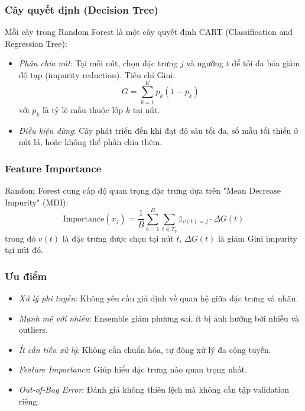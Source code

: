 ﻿\documentclass{article}
\begin{document}
\subsubsection*{Cây quyết định (Decision Tree)}
Mỗi cây trong Random Forest là một cây quyết định CART (Classification and Regression Tree):
\begin{itemize}
    \item \textit{Phân chia nút}: Tại mỗi nút, chọn đặc trưng $j$ và ngưỡng $t$ để tối đa hóa giảm độ tạp (impurity reduction). Tiêu chí Gini:
    \begin{equation}
    G = \sum_{k=1}^{K}p_k(1-p_k)
    \end{equation}
    với $p_k$ là tỷ lệ mẫu thuộc lớp $k$ tại nút.
    \item \textit{Điều kiện dừng}: Cây phát triển đến khi đạt độ sâu tối đa, số mẫu tối thiểu ở nút lá, hoặc không thể phân chia thêm.
\end{itemize}

\subsubsection*{Feature Importance}
Random Forest cung cấp độ quan trọng đặc trưng dựa trên "Mean Decrease Impurity" (MDI):
\begin{equation}
\text{Importance}(x_j) = \frac{1}{B}\sum_{b=1}^{B}\sum_{t \in T_b}\mathbb{1}_{v(t)=j} \cdot \Delta G(t)
\end{equation}
trong đó $v(t)$ là đặc trưng được chọn tại nút $t$, $\Delta G(t)$ là giảm Gini impurity tại nút đó.

\subsubsection*{Ưu điểm}
\begin{itemize}
    \item \textit{Xử lý phi tuyến}: Không yêu cầu giả định về quan hệ giữa đặc trưng và nhãn.
    \item \textit{Mạnh mẽ với nhiễu}: Ensemble giảm phương sai, ít bị ảnh hưởng bởi nhiễu và outliers.
    \item \textit{Ít cần tiền xử lý}: Không cần chuẩn hóa, tự động xử lý đa cộng tuyến.
    \item \textit{Feature Importance}: Giúp hiểu đặc trưng nào quan trọng nhất.
    \item \textit{Out-of-Bag Error}: Đánh giá không thiên lệch mà không cần tập validation riêng.
\end{itemize}
\end{document}
